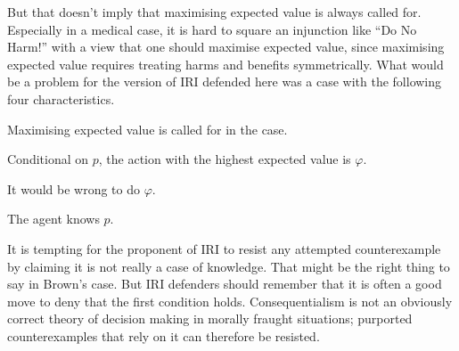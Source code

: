\documentclass[oneside]{book}
\begin{document}
\noindent But that doesn't imply that maximising expected value is always called for. Especially in a medical case, it is hard to square an injunction like ``Do No Harm!'' with a view that one should maximise expected value, since maximising expected value requires treating harms and benefits symmetrically. What would be a problem for the version of IRI defended here was a case with the following four characteristics.

\begin{itemize*}
\item Maximising expected value is called for in the case.
\item Conditional on $p$, the action with the highest expected value is $\varphi$.
\item It would be wrong to do $\varphi$.
\item The agent knows $p$.
\end{itemize*}

\noindent It is tempting for the proponent of IRI to resist any attempted counterexample by claiming it is not really a case of knowledge. That might be the right thing to say in Brown's case. But IRI defenders should remember that it is often a good move to deny that the first condition holds. Consequentialism is not an obviously correct theory of decision making in morally fraught situations; purported counterexamples that rely on it can therefore be resisted.





\end{document}

